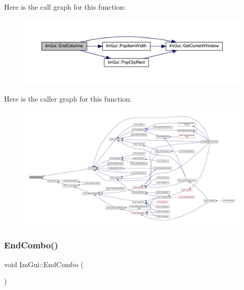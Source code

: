 Here is the call graph for this function\+:
\nopagebreak
\begin{figure}[H]
\begin{center}
\leavevmode
\includegraphics[width=350pt]{namespace_im_gui_af93bed3bce5475fe4d525d744f16aa20_cgraph}
\end{center}
\end{figure}
Here is the caller graph for this function\+:
\nopagebreak
\begin{figure}[H]
\begin{center}
\leavevmode
\includegraphics[width=350pt]{namespace_im_gui_af93bed3bce5475fe4d525d744f16aa20_icgraph}
\end{center}
\end{figure}
\mbox{\label{namespace_im_gui_a63434692d7de278875c7ea0143fbe6e4}} 
\subsubsection{\texorpdfstring{End\+Combo()}{EndCombo()}}
{\footnotesize\ttfamily void Im\+Gui\+::\+End\+Combo (\begin{DoxyParamCaption}{ }\end{DoxyParamCaption})}

